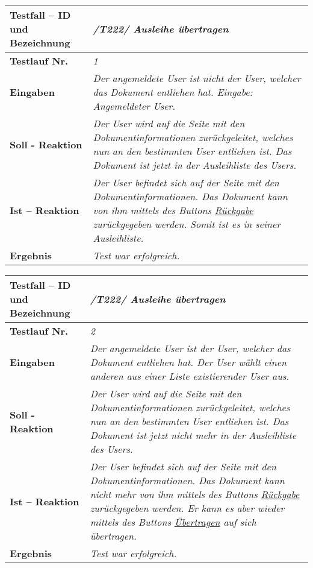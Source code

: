 \begin{longtable}{|p{5cm}|p{10cm}|}
\hline
\textbf{Testfall -- ID und Bezeichnung} & \textit{/T222/ Ausleihe übertragen} \\
\hline
\textbf{Testlauf Nr.} & \textit{1} \\
\hline
\textbf{Eingaben} & \textit{
Der angemeldete User ist nicht der User, welcher das Dokument
entliehen hat. Eingabe: Angemeldeter User.} \\
\hline
\textbf{Soll - Reaktion} & \textit{
Der User wird auf die Seite mit den Dokumentinformationen
zurückgeleitet, welches nun an den bestimmten User entliehen ist.
Das Dokument ist jetzt in der Ausleihliste des Users.
} \\
\hline
\textbf{Ist -- Reaktion} & \textit{
Der User befindet sich auf der Seite mit den Dokumentinformationen.
Das Dokument kann von ihm mittels des Buttons \uline{Rückgabe}
zurückgegeben werden. Somit ist es in seiner Ausleihliste.} \\
\hline
\textbf{Ergebnis} & \textit{
Test war erfolgreich.} \\
\hline
\end{longtable}

\begin{longtable}{|p{5cm}|p{10cm}|}
\hline
\textbf{Testfall -- ID und Bezeichnung} & \textit{/T222/ Ausleihe
übertragen} \\
\hline
\textbf{Testlauf Nr.} & \textit{2} \\
\hline
\textbf{Eingaben} & \textit{
Der angemeldete User ist der User, welcher das Dokument entliehen hat. Der
User wählt einen anderen aus einer Liste existierender User aus.} \\
\hline
\textbf{Soll - Reaktion} & \textit{
Der User wird auf die Seite mit den Dokumentinformationen
zurückgeleitet, welches nun an den bestimmten User entliehen ist.
Das Dokument ist jetzt nicht mehr in der Ausleihliste des Users.
} \\
\hline
\textbf{Ist -- Reaktion} & \textit{
Der User befindet sich auf der Seite mit den Dokumentinformationen.
Das Dokument kann nicht mehr von ihm mittels des Buttons \uline{Rückgabe}
zurückgegeben werden. Er kann es aber wieder mittels des Buttons
\uline{Übertragen} auf sich übertragen.} \\
\hline
\textbf{Ergebnis} & \textit{
Test war erfolgreich.} \\
\hline
\end{longtable}

